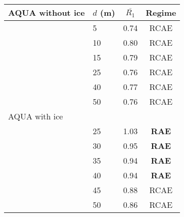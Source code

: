 \documentclass{ametsocV5}
\begin{document}
%

\begin{table}[t]
  \caption{}
    \label{tab:aqua-r1}
\begin{center}
  \renewcommand{\arraystretch}{1.0}
  \begin{tabular}{ l l c c }
      AQUA without ice &   $d$ (m) &  $\overline{R_1}$ & Regime        \\
      \hline
      & 5        & 0.74 & RCAE       \\
      & 10       & 0.80 & RCAE       \\
      & 15       & 0.79 & RCAE       \\
      & 25       & 0.76 & RCAE       \\
      & 40       & 0.77 & RCAE       \\
      & 50       & 0.76 & RCAE       \\ \newline

      AQUA with ice \\ %
      \hline
      & 25       & 1.03 & \textbf{ RAE }\\
      & 30       & 0.95 & \textbf{ RAE } \\
      & 35       & 0.94 & \textbf{ RAE } \\
      & 40       & 0.94 & \textbf{ RAE } \\
      & 45       & 0.88 & RCAE \\
      & 50       & 0.86 & RCAE \\

  \end{tabular}
\end{center}
\end{table}
\end{document}
